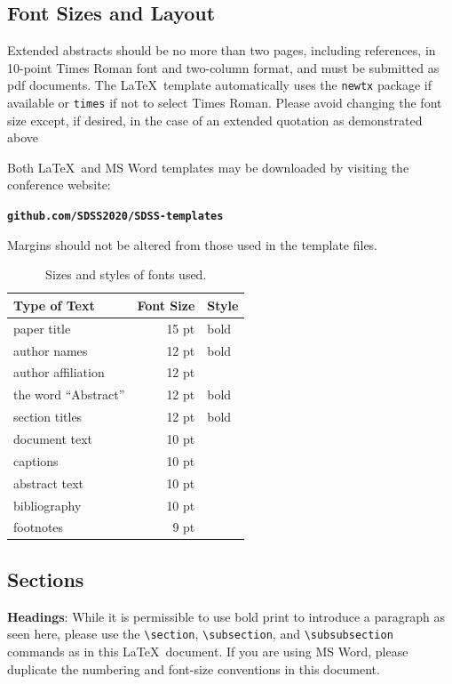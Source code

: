 \documentclass[10pt]{article}
\begin{document}
\subsection{Font Sizes and Layout}
Extended abstracts should be no more than two pages, including references,
in 10-point Times Roman font and two-column format, and must be submitted as pdf documents.
The \LaTeX\ template automatically uses the {\tt newtx} package if available
or {\tt times} if not to select Times Roman.
Please avoid changing the font size except, if desired, in the case of an extended
quotation as demonstrated above

Both \LaTeX\ and 
MS Word templates may be downloaded by visiting the conference website:
\begin{center}
\textbf{\texttt{github.com/SDSS2020/SDSS-templates}}
\end{center}
Margins should not be altered from those used in the template files.

\begin{table}[h]
\begin{center}
\begin{tabular}{|l|rl|}
\hline \bf Type of Text & \bf Font Size & \bf Style \\ \hline
paper title & 15 pt & bold \\
author names & 12 pt & bold \\
author affiliation & 12 pt & \\
the word ``Abstract'' & 12 pt & bold \\
section titles & 12 pt & bold \\
document text & 10 pt  &\\
captions & 10 pt & \\
abstract text & 10 pt & \\
bibliography & 10 pt & \\
footnotes & 9 pt & \\
\hline
\end{tabular}
\end{center}
\caption{\label{fontsizes} Sizes and styles of fonts used.}
\end{table}


\subsection{Sections}
\label{info-on-sections}

{\bf Headings}: While it is permissible to use bold print to introduce a paragraph
as seen here, please use the \verb+\section+,
\verb+\subsection+, and \verb+\subsubsection+
commands as in this \LaTeX\ document.  If you are using MS Word, please duplicate
the numbering and font-size conventions in this document.
\end{document}
